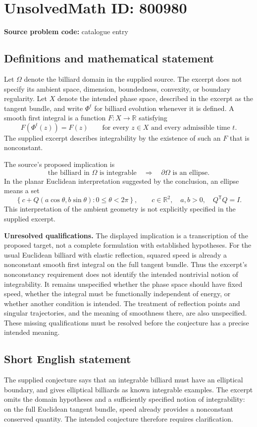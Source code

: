 \documentclass[11pt]{article}
\newcommand{\R}{\mathbb{R}}
\begin{document}
\section*{UnsolvedMath ID: 800980}
\textbf{Source problem code:} catalogue entry
\subsection{Definitions and mathematical statement}
Let \(\Omega\) denote the billiard domain in the supplied source. The excerpt does not specify its ambient space, dimension, boundedness, convexity, or boundary regularity. Let \(X\) denote the intended phase space, described in the excerpt as the tangent bundle, and write \(\Phi^t\) for billiard evolution whenever it is defined. A smooth first integral is a function \(F\colon X\to\R\) satisfying
\[
F(\Phi^t(z))=F(z)
\qquad\text{for every }z\in X\text{ and every admissible time }t.
\]
The supplied excerpt describes integrability by the existence of such an \(F\) that is nonconstant.

The source's proposed implication is
\[
\text{the billiard in }\Omega\text{ is integrable}
\quad\Longrightarrow\quad
\partial\Omega\text{ is an ellipse}.
\]
In the planar Euclidean interpretation suggested by the conclusion, an ellipse means a set
\[
\left\{c+Q(a\cos\theta,b\sin\theta):0\leq\theta<2\pi\right\},
\qquad c\in\R^2,\quad a,b>0,\quad Q^{\mathsf T}Q=I.
\]
This interpretation of the ambient geometry is not explicitly specified in the supplied excerpt.

\textbf{Unresolved qualifications.} The displayed implication is a transcription of the proposed target, not a complete formulation with established hypotheses. For the usual Euclidean billiard with elastic reflection, squared speed is already a nonconstant smooth first integral on the full tangent bundle. Thus the excerpt's nonconstancy requirement does not identify the intended nontrivial notion of integrability. It remains unspecified whether the phase space should have fixed speed, whether the integral must be functionally independent of energy, or whether another condition is intended. The treatment of reflection points and singular trajectories, and the meaning of smoothness there, are also unspecified. These missing qualifications must be resolved before the conjecture has a precise intended meaning.
\subsection{Short English statement}
The supplied conjecture says that an integrable billiard must have an elliptical boundary, and gives elliptical billiards as known integrable examples. The excerpt omits the domain hypotheses and a sufficiently specified notion of integrability: on the full Euclidean tangent bundle, speed already provides a nonconstant conserved quantity. The intended conjecture therefore requires clarification.
\end{document}
